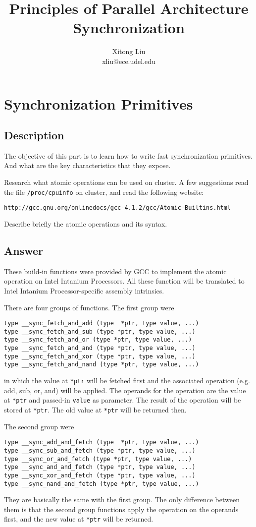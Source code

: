 \documentclass[12pt]{article}
\title{Principles of Parallel Architecture\\
Synchronization}
\author{Xitong Liu \\
xliu@ece.udel.edu}
\begin{document}
\maketitle

\section{Synchronization Primitives}
\subsection{Description}
The objective of this part is to learn how to write fast synchronization 
primitives. And what are the key characteristics that they expose.

Research what atomic operations can be used on cluster. A few suggestions 
read the file \texttt{/proc/cpuinfo} on cluster, and read the following 
website:

\texttt{http://gcc.gnu.org/onlinedocs/gcc-4.1.2/gcc/Atomic-Builtins.html}

Describe briefly the atomic operations and its syntax.

\subsection{Answer}
These build-in functions were provided by GCC to implement the atomic 
operation on Intel Intanium Processors. All these function will be 
translated to Intel Intanium Processor-specific assembly intrinsics.

There are four groups of functions. The first group were
\begin{verbatim}
type __sync_fetch_and_add (type  *ptr, type value, ...)
type __sync_fetch_and_sub (type *ptr, type value, ...)
type __sync_fetch_and_or (type *ptr, type value, ...)
type __sync_fetch_and_and (type *ptr, type value, ...)
type __sync_fetch_and_xor (type *ptr, type value, ...)
type __sync_fetch_and_nand (type *ptr, type value, ...)
\end{verbatim}
in which the value at \texttt{*ptr} will be fetched first and the associated 
operation (e.g. add, sub, or, and) will be applied. The operands for the
operation are the value at \texttt{*ptr} and passed-in \texttt{value} as 
parameter. The result of the operation will be stored at \texttt{*ptr}. The 
old value at \texttt{*ptr} will be returned then.

The second group were
\begin{verbatim}
type __sync_add_and_fetch (type  *ptr, type value, ...)
type __sync_sub_and_fetch (type *ptr, type value, ...)
type __sync_or_and_fetch (type *ptr, type value, ...)
type __sync_and_and_fetch (type *ptr, type value, ...)
type __sync_xor_and_fetch (type *ptr, type value, ...)
type __sync_nand_and_fetch (type *ptr, type value, ...)
\end{verbatim}
They are basically the same with the first group. The only difference between 
them is that the second group functions apply the operation on the operands 
first, and the new value at \texttt{*ptr} will be returned.
\end{document}
